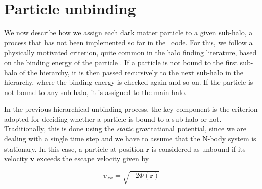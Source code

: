 \section{Particle unbinding}

We now describe how we assign each dark matter particle to a given
sub-halo, a process that has not been implemented so far in the
\phew\ code.  For this, we follow a physically motivated criterion,
quite common in the halo finding literature, based on the binding
energy of the particle \citep[e.g.][]{knollmannAHFAmigaHalo2009,
springelPopulatingClusterGalaxies2001, stadelCosmologicalNbodySimulations2001}.  If a
particle is not bound to the first sub-halo of the hierarchy, it is
then passed recursively to the next sub-halo in the hierarchy, where
the binding energy is checked again and so on.  If the particle is not
bound to any sub-halo, it is assigned to the main halo.

In the previous hierarchical unbinding process, the key component is
the criterion adopted for deciding whether a particle is bound to a
sub-halo or not.  Traditionally, this is done using the \emph{static}
gravitational potential, since we are dealing with a single time step
and we have to assume that the N-body system is stationary.  In this
case, a particle at position $\mathbf{r}$ is considered as unbound if its
velocity $\mathbf{v}$ exceeds the escape velocity given by

\begin{equation}
v_{\mathrm{esc}} = \sqrt{- 2\Phi(\mathbf{r})}
\label{eq:boundv}
\end{equation}

